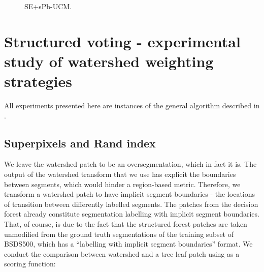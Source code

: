 \begin{figure}[ht!]
\centering
\caption[(SE and spectralPb)-UCM plots]{SE+sPb-UCM.}
\label{fig:SE_nnms_sPb-UCM}
\end{figure}



\section[Structured voting]{Structured voting - experimental study of watershed weighting strategies}
\label{sec:ch5-structured-voting}
All experiments presented here are instances of the general algorithm described in .

\subsection{Superpixels and Rand index}
We leave the watershed patch to be an oversegmentation, which in fact it is. The output of the watershed transform that we use has explicit the boundaries between segments, which would hinder a region-based metric. Therefore, we transform a watershed patch to have implicit segment boundaries - the locations of transition between differently labelled segments. 
The patches from the decision forest already constitute segmentation labelling with implicit segment boundaries. That, of course, is due to the fact that the structured forest patches are taken unmodified from the ground truth segmentations of the training subset of BSDS500, which has a ``labelling with implicit segment boundaries'' format. We conduct the comparison between watershed and a tree leaf patch using as a scoring function:

